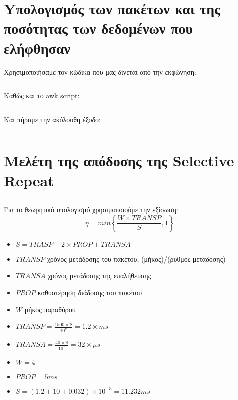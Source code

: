 \documentclass[a4paper,9pt]{article}
\begin{document}
\def\thesection {\Roman{section}.}
\def\thesubsection {\Roman{subsection}.}



\section*{Yπολογισμός των πακέτων και της ποσότητας των δεδομένων που
ελήφθησαν}

Χρησιμοποιήσαμε τον κώδικα που μας δίνεται από την εκφώνηση:

\inputminted[fontsize=\footnotesize,linenos,frame=leftline]{tcl}{files/ex5_1.tcl}

Καθώς και το awk script:

\inputminted[fontsize=\footnotesize,linenos,frame=leftline]{awk}{files/script_1.awk}

Και πήραμε την ακόλουθη έξοδο:

\inputminted[fontsize=\footnotesize,linenos,frame=leftline]{text}{files/awk.out}

\section*{Μελέτη της απόδοσης της Selective Repeat}

\subsection{}
Για το θεωρητικό υπολογισμό χρησιμοποιούμε την εξίσωση:
\[\eta=min\left\{ \frac{W \times TRANSP}{S},1\right\} \]
\begin{itemize}
    \item $S = TRASP + 2 \times PROP + TRANSA$
    \item $TRANSP$ χρόνος μετάδοσης του πακέτου, (μήκος)/(ρυθμός μετάδοσης)
    \item $TRANSA$ χρόνος μετάδοσης της επαλήθευσης
    \item $PROP$ καθυστέρηση διάδοσης του πακέτου
    \item $W$ μήκος παραθύρου
\end{itemize}


\begin{itemize}
    \item $TRANSP = \frac{1500 \times 8}{10^7} = 1.2 \times ms$
    \item $TRANSA = \frac{40 \times 8}{10^7} = 32 \times \mu s$
    \item $W=4$
    \item $PROP = 5 ms$
    \item $S = (1.2 + 10 + 0.032) \times 10^{-3} = 11.232 ms$
\end{itemize}
\end{document}
